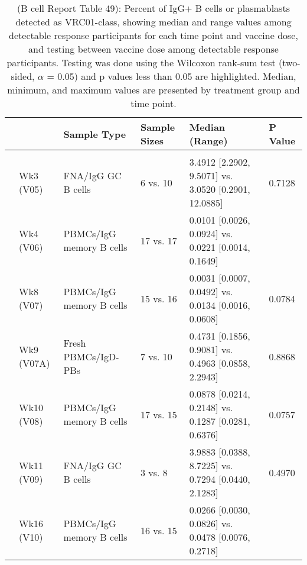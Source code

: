 \documentclass[
]{article}
\author{}
\date{\vspace{-2.5em}}
\begin{document}
\begin{table}[!h]

\caption[ (B cell Report Table 49): Percent of IgG+ B cells or plasmablasts detected as VRC01-class, showing median and range values among detectable response participants for each time point and vaccine dose, and testing between vaccine dose among detectable response participants]{\label{tab:bcell-tab-49} (B cell Report Table 49): Percent of IgG+ B cells or plasmablasts detected as VRC01-class, showing median and range values among detectable response participants for each time point and vaccine dose, and testing between vaccine dose among detectable response participants. Testing was done using the Wilcoxon rank-sum test (two-sided, $\alpha$ = 0.05) and p values less than 0.05 are highlighted. Median, minimum, and maximum values are presented by treatment group and time point.}
\centering
\fontsize{7.5}{9.5}\selectfont
\begin{tabular}[t]{llllll}
\toprule
 &  & Sample Type & Sample Sizes & Median (Range) & P Value\\
\midrule
\addlinespace[0.3em]
\multicolumn{6}{l}{\textbf{20µg vs. 100µg}}\\
\hspace{1em} & Wk3 (V05) & FNA/IgG GC B cells & 6 vs. 10 & 3.4912 [2.2902, 9.5071] vs. 3.0520 [0.2901, 12.0885] & 0.7128\\
\cmidrule{2-6}
\hspace{1em} & Wk4 (V06) & PBMCs/IgG memory B cells & 17 vs. 17 & 0.0101 [0.0026, 0.0924] vs. 0.0221 [0.0014, 0.1649] & \cellcolor{yellow}{0.0447}\\
\cmidrule{2-6}
\hspace{1em} & Wk8 (V07) & PBMCs/IgG memory B cells & 15 vs. 16 & 0.0031 [0.0007, 0.0492] vs. 0.0134 [0.0016, 0.0608] & 0.0784\\
\cmidrule{2-6}
\hspace{1em} & Wk9 (V07A) & Fresh PBMCs/IgD- PBs & 7 vs. 10 & 0.4731 [0.1856, 0.9081] vs. 0.4963 [0.0858, 2.2943] & 0.8868\\
\cmidrule{2-6}
\hspace{1em} & Wk10 (V08) & PBMCs/IgG memory B cells & 17 vs. 15 & 0.0878 [0.0214, 0.2148] vs. 0.1287 [0.0281, 0.6376] & 0.0757\\
\cmidrule{2-6}
\hspace{1em} & Wk11 (V09) & FNA/IgG GC B cells & 3 vs. 8 & 3.9883 [0.0388, 8.7225] vs. 0.7294 [0.0440, 2.1283] & 0.4970\\
\cmidrule{2-6}
\hspace{1em} & Wk16 (V10) & PBMCs/IgG memory B cells & 16 vs. 15 & 0.0266 [0.0030, 0.0826] vs. 0.0478 [0.0076, 0.2718] & \cellcolor{yellow}{0.0298}\\
\bottomrule
\end{tabular}
\end{table}
\end{document}
